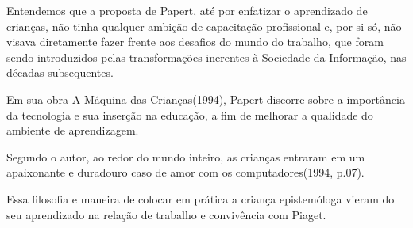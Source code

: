 \documentclass[
12pt,		%
openright,	%
twoside,  %
a4paper,			%
chapter=TITLE,		%
english,			%
french,				%
spanish,			%
brazil				%
]{USPSC-classe/USPSC}
\begin{document}
Entendemos que a proposta de Papert, at\'e por enfatizar o aprendizado de crian\c{c}as, n\~ao tinha qualquer ambi\c{c}\~ao de capacita\c{c}\~ao profissional e, por si s\'o, n\~ao visava diretamente fazer frente aos desafios do \textquotedbl mundo do trabalho\textquotedbl , que foram sendo introduzidos pelas transforma\c{c}\~oes inerentes \`a Sociedade da Informa\c{c}\~ao, nas d\'ecadas subsequentes.

















Em sua obra \textquotedbl A M\'aquina das Crian\c{c}as\textquotedbl  (1994), Papert discorre sobre a import\^ancia da tecnologia e sua inser\c{c}\~ao na educa\c{c}\~ao, a fim de melhorar a qualidade do ambiente de aprendizagem.


















\noindent\begin{center}\mbox{\centering{}}\end{center}


Segundo o autor, \textquotedbl ao redor do mundo inteiro, as crian\c{c}as entraram em um apaixonante e duradouro caso de amor com os computadores\textquotedbl  (1994, p.07).

















Essa filosofia e maneira de colocar em pr\'atica a crian\c{c}a epistem\'ologa vieram do seu aprendizado na rela\c{c}\~ao de trabalho e conviv\^encia com Piaget.
\end{document}
